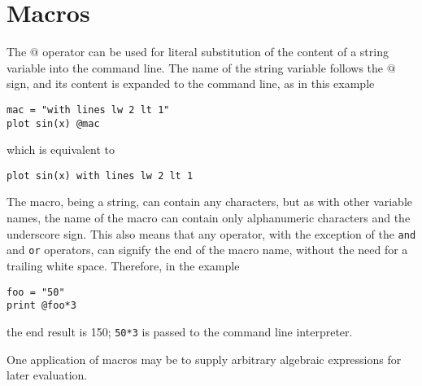 \section{Macros}

The $@$ operator can be used for literal substitution of the content of a
string variable into the command line.  The name of the string variable follows
the $@$ sign, and its content is expanded to the command line, as in this
example
\begin{verbatim}
mac = "with lines lw 2 lt 1"
plot sin(x) @mac
\end{verbatim}
which is equivalent to 
\begin{verbatim}
plot sin(x) with lines lw 2 lt 1
\end{verbatim}

The macro, being a string, can contain any characters, but as with other
variable names, the name of the macro can contain only alphanumeric characters
and the underscore sign. This also means that any operator, with the exception
of the {\tt and} and {\tt or} operators, can signify the end of the macro name,
without the need for a trailing white space. Therefore, in the example
\begin{verbatim}
foo = "50"
print @foo*3
\end{verbatim}
the end result is 150; {\tt 50*3} is passed to the command line interpreter.

One application of macros may be to supply arbitrary algebraic expressions for
later evaluation.

